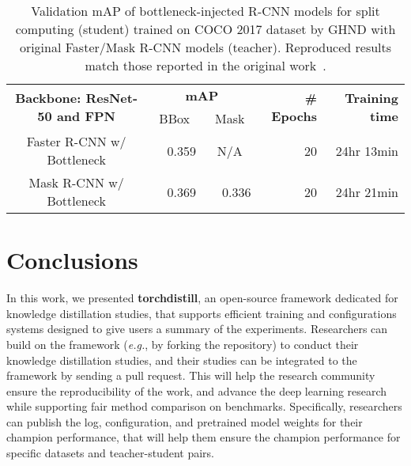 \documentclass[runningheads]{llncs}
\newcommand{\FRAMEWORK}{{\bf torchdistill}\xspace}
\begin{document}
\begin{table}[t]
    \caption{Validation mAP of bottleneck-injected R-CNN models for split computing (student) trained on COCO 2017 dataset by GHND with original Faster/Mask R-CNN models (teacher). Reproduced results match those reported in the original work~\cite{matsubara2020neural}.}
    \begin{center}
        \bgroup
        \setlength{\tabcolsep}{0.3em}
        \def\arraystretch{1.1}
        \begin{tabular}{|c|r|r|r|r|}
            \hline
            \multirow{2}{*}{\bf Backbone: ResNet-50 and FPN}& \multicolumn{2}{c|}{\bf mAP} & \multirow{2}{*}{\bf \# Epochs} & \multirow{2}{*}{\bf Training time} \\ \cline{2-3}
            & \multicolumn{1}{c|}{~BBox~} & \multicolumn{1}{c|}{~Mask~} & & \\ \hline \hline
            Faster R-CNN w/ Bottleneck & 0.359 & \multicolumn{1}{c|}{N/A} & 20 & 24hr 13min \\
            Mask R-CNN w/ Bottleneck & 0.369 & 0.336 & 20 & 24hr 21min \\ \hline
        \end{tabular}
    \egroup
    \end{center}
\label{table:coco_experiments}
\end{table}








\section{Conclusions}
In this work, we presented \FRAMEWORK, an open-source framework dedicated for knowledge distillation studies, that supports efficient training and configurations systems designed to give users a summary of the experiments.
Researchers can build on the framework (\emph{e.g.}, by forking the repository) to conduct their knowledge distillation studies, and their studies can be integrated to the framework by sending a pull request.
This will help the research community ensure the reproducibility of the work, and advance the deep learning research while supporting fair method comparison on benchmarks.
Specifically, researchers can publish the log, configuration, and pretrained model weights for their champion performance, that will help them ensure the champion performance for specific datasets and teacher-student pairs.
\end{document}

